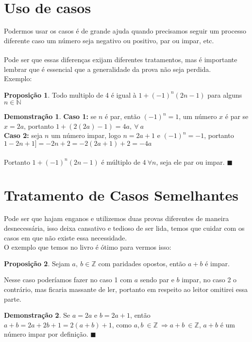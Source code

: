 \documentclass[a4paper,11pt,oneside]{book}
\theoremstyle{definition}
\theoremstyle{break}
\newtheorem{demonstration}{Demonstração}[section]
\newtheorem{proposition}{Proposição}
\begin{document}
\section{Uso de casos}
Podermos usar os casos é de grande ajuda quando precisamos seguir um processo diferente caso um número seja negativo ou positivo, par ou impar, etc.
\\
\\
Pode ser que essas diferenças exijam diferentes tratamentos, mas é importante lembrar que é essencial que a generalidade da prova não seja perdida.
\\
Exemplo:
\begin{proposition}
Todo multiplo de 4 é igual à $1+(-1)^n(2n-1)$ para alguns $n \in \mathbb{N}$
\end{proposition}
\begin{demonstration}
\textbf{Caso 1:} se $n$ é par, então $(-1)^n =1$, um número $x$ é par se $x=2a$, portanto $1+(2(2a)-1) = 4a, \ \forall \ a$ \\
\textbf{Caso 2:} seja $n$ um número impar, logo $n=2a+1$ e $(-1)^n = -1$, portanto $1-2n+1] = -2n + 2= -2(2a+1) + 2 = -4a$
\\
\\
Portanto $1+(-1)^n(2n-1)$ é múltiplo de $4 \ \forall n$, seja ele par ou impar. $\blacksquare$ 
\end{demonstration}
\section{Tratamento de Casos Semelhantes}
Pode ser que hajam enganos e utilizemos duas provas diferentes de maneira desnecessária, isso deixa cansativo e tedioso de ser lida, temos que cuidar com os casos em que não existe essa necessidade.
\\
O exemplo que temos no livro é ótimo para vermos isso:

\begin{proposition}
Sejam $a, \ b  \in \mathbb{Z}$ com paridades opostos, então $a+b$ é impar.
\end{proposition}

Nesse caso poderíamos fazer no caso 1 com $a$ sendo par e $b$ impar, no caso 2 o contrário, mas ficaria massante de ler, portanto em respeito ao leitor omitirei essa parte.

\begin{demonstration}
Se $a = 2a$ e $b=2a+1$, então $a+b = 2a+2b+1 = 2(a+b) +1$, como $a,b \ \in \mathbb{Z} \ \Rightarrow a+b \ \in \mathbb{Z}$, $a+b$ é um número impar por definição. $\blacksquare$ 
\end{demonstration}
\end{document}
